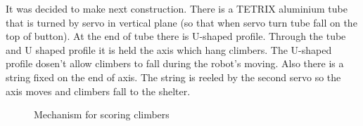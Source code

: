 \begin{enumerate*}
    \item It was decided to make next construction. There is a TETRIX aluminium tube that  is turned by servo in vertical plane (so that when servo turn tube fall on the top of button). At the end of tube there is U-shaped profile. Through the tube and U shaped profile it is held the axis which hang climbers. The U-shaped profile dosen't allow climbers to fall during the robot's moving. Also there is a string fixed on the end of axis. The string is reeled by the second servo so the axis moves and climbers fall to the shelter.
    \begin{figure}[h]
    	\begin{minipage}[h]{1\linewidth}
    		\caption{Mechanism for scoring climbers}
    	\end{minipage}
    \end{figure}
  
  \end{enumerate*}	
  
  
  
